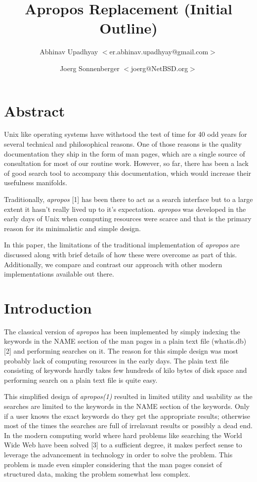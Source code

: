 \documentclass[titlepage, a4paper, 12pt]{article}
\title{Apropos Replacement \newline
(Initial Outline)}
\author{Abhinav Upadhyay $<$er.abhinav.upadhyay@gmail.com$>$ \and 
Joerg Sonnenberger $<$joerg@NetBSD.org$>$}
\begin{document}
\maketitle
\section{Abstract}
Unix like operating systems have withstood the test of time for 40 odd years for
several technical and philosophical reasons. One of those reasons is the
quality documentation they ship in the form of man pages, which are a single
source of consultation for most of our routine work. However, so far, there has been a lack of
good search tool to accompany this documentation, which would increase their
usefulness manifolds.

Traditionally, \textit{apropos} [1] has been there to act as a search
interface but to a large extent it hasn't really lived up to it's expectation.
\textit{apropos} was
developed in the early days of Unix when computing resources were scarce and
that is the primary reason for its minimalistic and simple design.

In this paper, the limitations of the traditional implementation of
\textit{apropos} are discussed along with brief details of how these were overcome as part of this.
Additionally, we compare and contrast our approach with other modern implementations available out there.

\section{Introduction}
The classical version of \textit{apropos} has been implemented by simply
indexing the keywords in the NAME section of the man pages in a plain text file
(whatis.db) [2]
and performing searches on it. The reason for this simple design was most
probably lack of computing resources in the early days. The plain text file
consisting of keywords hardly takes few hundreds of kilo bytes of disk space
and performing search on a plain text file is quite easy.

This simplified design of \textit{apropos(1)} resulted in limited utility and
usability as the searches are limited to the keywords in the NAME section of the
 keywords. Only if
a user knows the exact keywords do they get the appropriate results; otherwise most of
the times the searches are full of irrelavant results or possibly a dead end. In the modern
computing world where hard problems like searching the World Wide Web have been
solved [3] to a sufficient degree, it makes perfect sense to leverage the advancement in technology 
in order to solve the problem. This problem is made even simpler considering that the man
pages consist of structured data, making the problem somewhat less complex.
\end{document}
